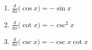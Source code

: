 {\begin{minipage}{.5\specialboxlength}
\begin{enumerate}
	\item		$\frac{d}{dx}\big(\cos x\big) = -\sin x$
	\item		$\frac{d}{dx}\big(\cot x\big) = -\csc^2x$
	\item		$\frac{d}{dx}\big(\csc x\big) = -\csc x\cot x$
	\end{enumerate}
\end{minipage}}

